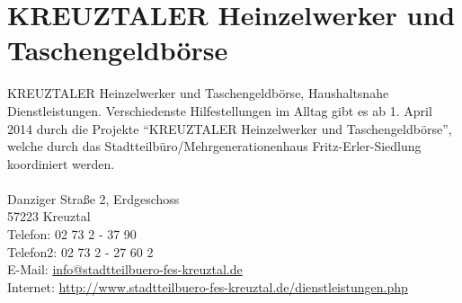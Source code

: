 \section{KREUZTALER Heinzelwerker und Taschengeldbörse}
KREUZTALER Heinzelwerker und Taschengeldbörse, Haushaltsnahe Dienstleistungen. Verschiedenste Hilfestellungen im Alltag gibt es ab 1. April 2014 durch die Projekte \enquote{KREUZTALER Heinzelwerker und Taschengeldbörse}, welche durch das Stadtteilbüro/Mehrgenerationenhaus Fritz-Erler-Siedlung koordiniert werden.\\
\\
Danziger Straße 2, Erdgeschoss\\
57223 Kreuztal \\
Telefon: 02 73 2 - 37 90\\
Telefon2: 02 73 2 - 27 60 2 \\
E-Mail: \href{mailto:info@stadtteilbuero-fes-kreuztal.de }{info@stadtteilbuero-fes-kreuztal.de }\\
Internet: \href{http://www.stadtteilbuero-fes-kreuztal.de/dienstleistungen.php }{http://www.stadtteilbuero-fes-kreuztal.de/dienstleistungen.php }
 